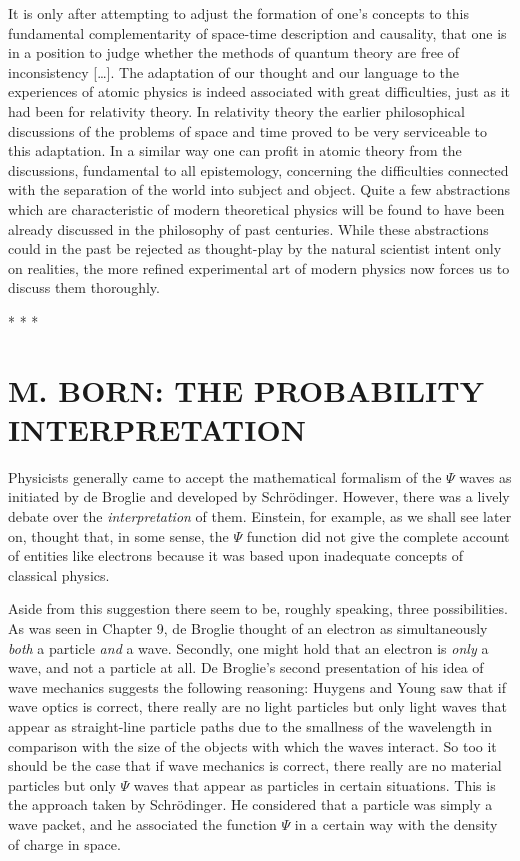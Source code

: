 It is only after attempting to adjust the formation of one's concepts
to this fundamental complementarity of space-time description and
causality, that one is in a position to judge whether the methods of
quantum theory are free of inconsistency [\ldots]. The adaptation of our
thought and our language to the experiences of atomic physics is indeed
associated with great difficulties, just as it had been for relativity
theory. In relativity theory the earlier philosophical discussions of
the problems of space and time proved to be very serviceable to this
adaptation. In a similar way one can profit in atomic theory from the
discussions, fundamental to all epistemology, concerning the
difficulties connected with the separation of the world into subject and
object. Quite a few abstractions which are characteristic of modern
theoretical physics will be found to have been already discussed in the
philosophy of past centuries. While these abstractions could in the past
be rejected as thought-play by the natural scientist intent only on
realities, the more refined experimental art of modern physics now
forces us to discuss them thoroughly.\\
\centerline{* * *}
%

\section*{M. BORN: THE PROBABILITY INTERPRETATION}

Physicists generally came to accept the mathematical formalism of the
$\Psi$ waves as initiated by de Broglie and developed by Schrödinger.
However, there was a lively debate over the \emph{interpretation} of
them. Einstein, for example, as we shall see later on, thought that, in
some sense, the $\Psi$ function did not give the complete account of
entities like electrons because it was based upon inadequate concepts of
classical physics.

Aside from this suggestion there seem to be, roughly speaking, three
possibilities. As was seen in Chapter 9, de Broglie thought of an
electron as simultaneously \emph{both} a particle \emph{and} a wave.
Secondly, one might hold that an electron is \emph{only} a wave, and not
a particle at all. De Broglie's second presentation of his idea of wave
mechanics suggests the following reasoning: Huygens and Young saw that
if wave optics is correct, there really are no light particles but only
light waves that appear as straight-line particle paths due to the
smallness of the wavelength in comparison with the size of the objects
with which the waves interact. So too it should be the case that if wave
mechanics is correct, there really are no material particles but only
$\Psi$ waves that appear as particles in certain situations. This is
the approach taken by Schrödinger. He considered that a particle was
simply a wave packet, and he associated the function $\Psi$ in a
certain way with the density of charge in space.

